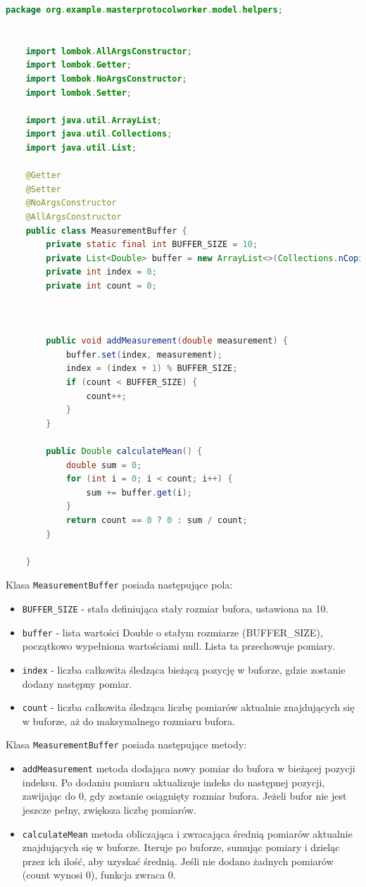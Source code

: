 \begin{lstlisting}[language=Java, caption=Kod bufora cyklicznego, label=measurementBufferCode]
    package org.example.masterprotocolworker.model.helpers;
    
    
    import lombok.AllArgsConstructor;
    import lombok.Getter;
    import lombok.NoArgsConstructor;
    import lombok.Setter;
    
    import java.util.ArrayList;
    import java.util.Collections;
    import java.util.List;
    
    @Getter
    @Setter
    @NoArgsConstructor
    @AllArgsConstructor
    public class MeasurementBuffer {
        private static final int BUFFER_SIZE = 10;
        private List<Double> buffer = new ArrayList<>(Collections.nCopies(BUFFER_SIZE, null));
        private int index = 0;
        private int count = 0;
    
    
    
        public void addMeasurement(double measurement) {
            buffer.set(index, measurement);
            index = (index + 1) % BUFFER_SIZE;
            if (count < BUFFER_SIZE) {
                count++;
            }
        }
    
        public Double calculateMean() {
            double sum = 0;
            for (int i = 0; i < count; i++) {
                sum += buffer.get(i);
            }
            return count == 0 ? 0 : sum / count;
        }
    
    }
\end{lstlisting}

Klasa \verb|MeasurementBuffer| posiada następujące pola:
\begin{itemize}
    \item \verb|BUFFER_SIZE| - stała definiująca stały rozmiar bufora, ustawiona na 10.
    \item \verb|buffer| - lista wartości Double o stałym rozmiarze (BUFFER\_SIZE), początkowo wypełniona wartościami null. Lista ta przechowuje pomiary.
    \item \verb|index| - liczba całkowita śledząca bieżącą pozycję w buforze, gdzie zostanie dodany następny pomiar.
    \item \verb|count| - liczba całkowita śledząca liczbę pomiarów aktualnie znajdujących się w buforze, aż do maksymalnego rozmiaru bufora.
\end{itemize}

Klasa \verb|MeasurementBuffer| posiada następujące metody:
\begin{itemize}
    \item \verb|addMeasurement| metoda dodająca nowy pomiar do bufora w bieżącej pozycji indeksu. Po dodaniu pomiaru aktualizuje indeks do następnej pozycji, zawijając do 0, gdy zostanie osiągnięty rozmiar bufora. Jeżeli bufor nie jest jeszcze pełny, zwiększa liczbę pomiarów.
    \item \verb|calculateMean| metoda obliczająca i zwracająca średnią pomiarów aktualnie znajdujących się w buforze. Iteruje po buforze, sumując pomiary i dzieląc przez ich ilość, aby uzyskać średnią. Jeśli nie dodano żadnych pomiarów (count wynosi 0), funkcja zwraca 0.
\end{itemize}

